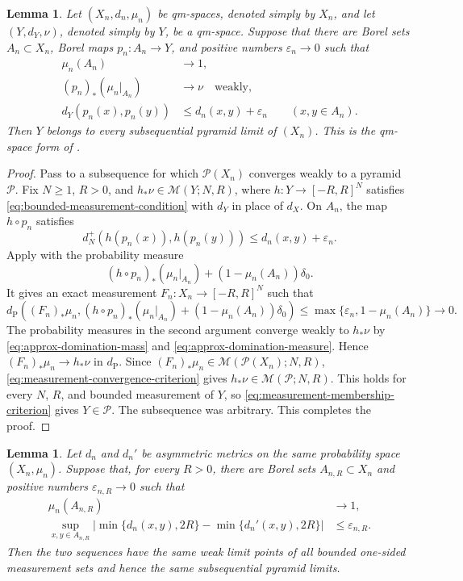 \documentclass{amsart}
\numberwithin{equation}{section}
\theoremstyle{plain}
\newtheorem{lemma}[theorem]{Lemma}
\theoremstyle{definition}
\theoremstyle{remark}
\newcommand{\Pyr}{\mathcal P}
\newcommand{\eps}{\varepsilon}
\begin{document}
\begin{lemma}\label{lem:high-mass-domination}
Let $(X_n,d_n,\mu_n)$ be qm-spaces, denoted simply by $X_n$, and let $(Y,d_Y,\nu)$, denoted simply by $Y$, be a qm-space.  Suppose that there are Borel sets $A_n\subset X_n$, Borel maps $p_n\colon A_n\to Y$, and positive numbers $\eps_n\to0$ such that
\begin{align}
\mu_n(A_n)&\longrightarrow1, \label{eq:approx-domination-mass}\\
(p_n)_*(\mu_n|_{A_n})&\longrightarrow\nu \quad\text{weakly}, \label{eq:approx-domination-measure}\\
d_Y(p_n(x),p_n(y))&\le d_n(x,y)+\eps_n \qquad(x,y\in A_n). \label{eq:approx-domination-distance}
\end{align}
Then $Y$ belongs to every subsequential pyramid limit of $(X_n)$.
This is the qm-space form of \cite[Proposition~3.11]{one-sided-pyramids}.
\end{lemma}

\begin{proof}
Pass to a subsequence for which $\Pyr(X_n)$ converges weakly to a pyramid $\mathcal P$.  Fix $N\ge1$, $R>0$, and $h_*\nu\in\mathcal M(Y;N,R)$, where $h\colon Y\to[-R,R]^N$ satisfies \eqref{eq:bounded-measurement-condition} with $d_Y$ in place of $d_X$.  On $A_n$, the map $h\circ p_n$ satisfies
\[ d_N^+(h(p_n(x)),h(p_n(y)))\le d_n(x,y)+\eps_n. \]
Apply  with the probability measure
\[ (h\circ p_n)_*(\mu_n|_{A_n})+(1-\mu_n(A_n))\delta_0. \]
It gives an exact measurement $F_n\colon X_n\to[-R,R]^N$ such that
\[ d_{\mathrm P}\left((F_n)_*\mu_n,(h\circ p_n)_*(\mu_n|_{A_n})+(1-\mu_n(A_n))\delta_0\right) \le\max\{\eps_n,1-\mu_n(A_n)\}\longrightarrow0. \]
The probability measures in the second argument converge weakly to $h_*\nu$ by \eqref{eq:approx-domination-mass} and \eqref{eq:approx-domination-measure}.  Hence $(F_n)_*\mu_n\to h_*\nu$ in $d_{\mathrm P}$.  Since $(F_n)_*\mu_n\in\mathcal M(\Pyr(X_n);N,R)$, \eqref{eq:measurement-convergence-criterion} gives $h_*\nu\in\mathcal M(\mathcal P;N,R)$.  This holds for every $N$, $R$, and bounded measurement of $Y$, so \eqref{eq:measurement-membership-criterion} gives $Y\in\mathcal P$.  The subsequence was arbitrary.
This completes the proof.
\end{proof}

\begin{lemma}\label{lem:bounded-kernel-transfer}
Let $d_n$ and $d_n'$ be asymmetric metrics on the same probability space $(X_n,\mu_n)$.  Suppose that, for every $R>0$, there are Borel sets $A_{n,R}\subset X_n$ and positive numbers $\eps_{n,R}\to0$ such that
\begin{align}
\mu_n(A_{n,R})&\longrightarrow1, \label{eq:bounded-kernel-mass}\\
 \sup_{x,y\in A_{n,R}}
 \left|\min\{d_n(x,y),2R\}-\min\{d_n'(x,y),2R\}\right|
 &\le\eps_{n,R}.
 \label{eq:bounded-kernel-comparison}
\end{align}
Then the two sequences have the same weak limit points of all bounded one-sided measurement sets and hence the same subsequential pyramid limits.
\end{lemma}
\end{document}
